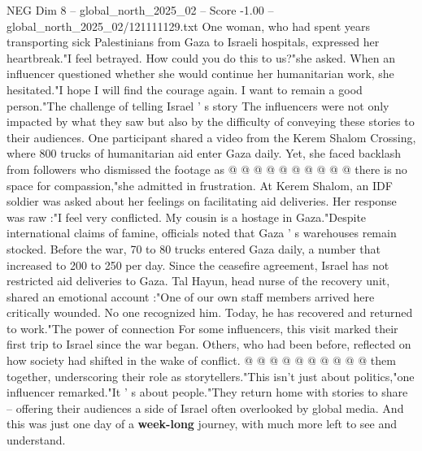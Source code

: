 \begin{textsample}{NEG Dim 8 – global\_north\_2025\_02 – Score -1.00 – global\_north\_2025\_02/121111129.txt}
One woman, who had spent years transporting sick Palestinians from Gaza to Israeli hospitals, expressed her heartbreak."I feel betrayed.
How could you do this to us?"she asked.
When an influencer questioned whether she would continue her humanitarian work, she hesitated."I hope I will find the courage again.
I want to remain a good person."The challenge of telling Israel ' s story The influencers were not only impacted by what they saw but also by the difficulty of conveying these stories to their audiences.
One participant shared a video from the Kerem Shalom Crossing, where 800 trucks of humanitarian aid enter Gaza daily.
Yet, she faced backlash from followers who dismissed the footage as @ @ @ @ @ @ @ @ @ @ there is no space for compassion,"she admitted in frustration.
At Kerem Shalom, an IDF soldier was asked about her feelings on facilitating aid deliveries.
Her response was raw :"I feel very conflicted.
My cousin is a hostage in Gaza."Despite international claims of famine, officials noted that Gaza ' s warehouses remain stocked.
Before the war, 70 to 80 trucks entered Gaza daily, a number that increased to 200 to 250 per day.
Since the ceasefire agreement, Israel has not restricted aid deliveries to Gaza.
Tal Hayun, head nurse of the recovery unit, shared an emotional account :"One of our own staff members arrived here critically wounded.
No one recognized him.
Today, he has recovered and returned to work."The power of connection For some influencers, this visit marked their first trip to Israel since the war began.
Others, who had been before, reflected on how society had shifted in the wake of conflict. @ @ @ @ @ @ @ @ @ @ them together, underscoring their role as storytellers."This isn't just about politics,"one influencer remarked."It ' s about people."They return home with stories to share -- offering their audiences a side of Israel often overlooked by global media.
And this was just one day of a \textbf{week-long} journey, with much more left to see and understand.

\end{textsample}

